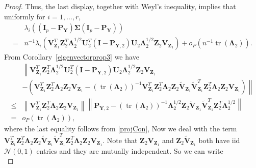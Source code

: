 \documentclass[12pt]{article} %
\DeclareMathOperator{\mytr}{tr}
\newcommand{\bZ}{\mathbf{Z}}
\newcommand{\bP}{\mathbf{P}}
\newcommand{\bY}{\mathbf{Y}}
\newcommand{\bI}{\mathbf{I}}
\newcommand{\bU}{\mathbf{U}}
\newcommand{\bV}{\mathbf{V}}
\newcommand{\bfsym}[1]{\ensuremath{\boldsymbol{#1}}}
\def\bLambda {\bfsym {\Lambda}}
\def\bSigma {\bfsym {\Sigma}}
\theoremstyle{definition}
\begin{document}
\begin{appendices}
\begin{proof}
         Thus, the last display, together with Weyl's inequality, implies that uniformly for $i=1,\ldots, r$,
\begin{equation}\label{choc3}
    \begin{split}
    &\lambda_i\left(
             (\bI_p -\bP_\bY)\bSigma (\bI_p- \bP_{\bY})
         \right)
         \\
             =&
             n^{-1}\lambda_i\left(
                  \bV_{\bZ_1}^T \bZ_2^T \bLambda_2^{1/2} \bU_2^T (\bI-\bP_{\bY,2}) \bU_2 \bLambda_2^{1/2} \bZ_2 \bV_{\bZ_1}
              \right)
              +o_P\left(n^{-1}\mytr(\bLambda_2)\right).
    \end{split}
\end{equation}
From Corollary~\ref{eigenvectorprop3} we have
\begin{equation}\label{jojojo}
    \begin{split}
                  &\left\|
                  \bV_{\bZ_1}^T \bZ_2^T \bLambda_2^{1/2} \bU_2^T (\bI-\bP_{\bY,2}) \bU_2 \bLambda_2^{1/2} \bZ_2 \bV_{\bZ_1}
              \right.
              \\
              &\left.
                  -\left(
                      \bV_{\bZ_1}^T \bZ_2^T \bLambda_2 \bZ_2 \bV_{\bZ_1}
                  -
            \left(\mytr(\bLambda_2)\right)^{-1}
            \bV_{\bZ_1}^T \bZ_2^T \bLambda_2\bZ_{2} \tilde{\bV}_{\bZ_1}
            \tilde{\bV}_{\bZ_1}^T \bZ_2^T \bLambda_2 \bZ_2 \bV_{\bZ_1}
                  \right)
                  \right\|
                  \\
                  \leq&
                  \left\|\bV_{\bZ_1}^T \bZ_2^T \bLambda_2 \bZ_2 \bV_{\bZ_1}\right\|
            \left\|\bP_{\bY,2}-
            \left(\mytr(\bLambda_2)\right)^{-1}
            \bLambda_2^{1/2}\bZ_{2} \tilde{\bV}_{\bZ_1}
            \tilde{\bV}_{\bZ_1}^T \bZ_2^T \bLambda_2^{1/2}
            \right\|
            \\
            =& o_P(\mytr(\bLambda_2)),
    \end{split}
\end{equation}
where the last equality follows from \eqref{projCon},
Now we deal with the term $
            \bV_{\bZ_1}^T \bZ_2^T \bLambda_2\bZ_{2} \tilde{\bV}_{\bZ_1}
            \tilde{\bV}_{\bZ_1}^T \bZ_2^T \bLambda_2 \bZ_2 \bV_{\bZ_1}
            $.
            Note that
            $\bZ_2\bV_{\bZ_1}$
            and
            $\bZ_2\tilde{\bV}_{\bZ_1}$
            both have iid $\mathcal{N}(0,1)$ entries and they are mutually independent.
            So we can write
\begin{equation*}

\end{equation*}
\end{proof}
\end{appendices}
\end{document}
